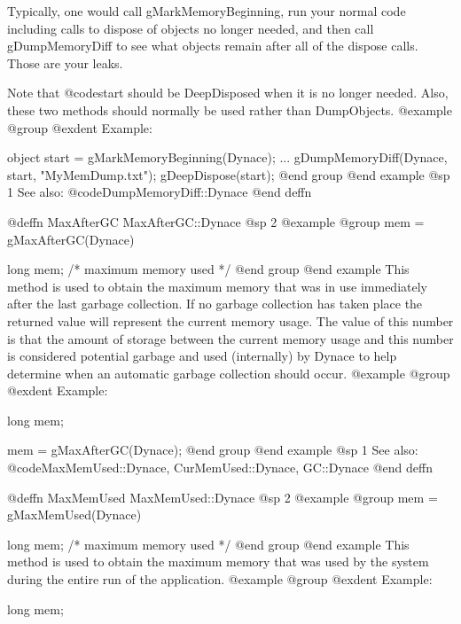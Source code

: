 Typically, one would call gMarkMemoryBeginning, run your normal code
including calls to dispose of objects no longer needed, and then
call gDumpMemoryDiff to see what objects remain after all of the 
dispose calls.  Those are your leaks.

Note that @code{start} should be DeepDisposed when it is no longer needed.
Also, these two methods should normally be used rather than DumpObjects.
@example
@group
@exdent Example:

object start = gMarkMemoryBeginning(Dynace);
...
gDumpMemoryDiff(Dynace, start, "MyMemDump.txt");
gDeepDispose(start);
@end group
@end example
@sp 1
See also:  @code{DumpMemoryDiff::Dynace}
@end deffn









@deffn {MaxAfterGC} MaxAfterGC::Dynace
@sp 2
@example
@group
mem = gMaxAfterGC(Dynace)

long    mem;    /*  maximum memory used  */
@end group
@end example
This method is used to obtain the maximum memory that was in use
immediately after the last garbage collection.  If no garbage
collection has taken place the returned value will represent
the current memory usage.  The value of this number is that
the amount of storage between the current memory usage and this number
is considered potential garbage and used (internally) by Dynace
to help determine when an automatic garbage collection should occur.
@example
@group
@exdent Example:

long    mem;

mem = gMaxAfterGC(Dynace);
@end group
@end example
@sp 1
See also:  @code{MaxMemUsed::Dynace, CurMemUsed::Dynace, GC::Dynace}
@end deffn


















@deffn {MaxMemUsed} MaxMemUsed::Dynace
@sp 2
@example
@group
mem = gMaxMemUsed(Dynace)

long    mem;    /*  maximum memory used  */
@end group
@end example
This method is used to obtain the maximum memory that was
used by the system during the entire run of the application.
@example
@group
@exdent Example:

long    mem;


